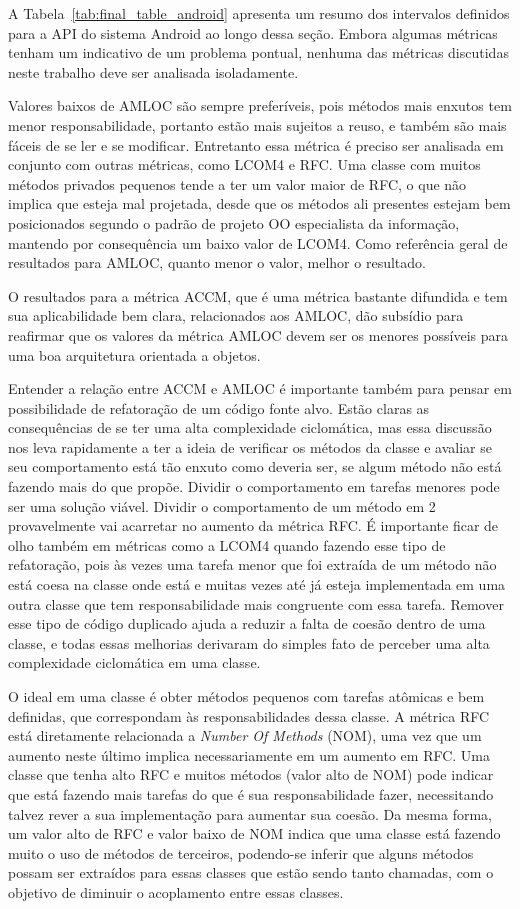 A Tabela~\ref{tab:final_table_android} apresenta um resumo dos intervalos definidos para a API do sistema Android ao longo dessa seção. Embora algumas métricas tenham um indicativo de um problema pontual, nenhuma das métricas discutidas neste trabalho deve ser analisada isoladamente.

Valores baixos de AMLOC são sempre preferíveis, pois métodos mais enxutos tem menor responsabilidade, portanto estão mais sujeitos a reuso, e também são mais fáceis de se ler e se modificar. Entretanto essa métrica é preciso ser analisada em conjunto com outras métricas, como LCOM4 e RFC. Uma classe com muitos métodos privados pequenos tende a ter um valor maior de RFC, o que não implica que esteja mal projetada, desde que os métodos ali presentes estejam bem posicionados segundo o padrão de projeto OO especialista da informação, mantendo por consequência um baixo valor de LCOM4. Como referência geral de resultados para AMLOC, quanto menor o valor, melhor o resultado.

O resultados para a métrica ACCM, que é uma métrica bastante difundida e tem sua aplicabilidade bem clara, relacionados aos AMLOC, dão subsídio para reafirmar que os valores da métrica AMLOC devem ser os menores possíveis para uma boa arquitetura orientada a objetos.

Entender a relação entre ACCM e AMLOC é importante também para pensar em possibilidade de refatoração de um código fonte alvo. Estão claras as consequências de se ter uma alta complexidade ciclomática, mas essa discussão nos leva rapidamente a ter a ideia de verificar os métodos da classe e avaliar se seu comportamento está tão enxuto como deveria ser, se algum método não está fazendo mais do que propõe. Dividir o comportamento em tarefas menores pode ser uma solução viável. Dividir o comportamento de um método em 2 provavelmente vai acarretar no aumento da métrica RFC. É importante ficar de olho também em métricas como a LCOM4 quando fazendo esse tipo de refatoração, pois às vezes uma tarefa menor que foi extraída de um método não está coesa na classe onde está e muitas vezes até já esteja implementada em uma outra classe que tem responsabilidade mais congruente com essa tarefa. Remover esse tipo de código duplicado ajuda a reduzir a falta de coesão dentro de uma classe, e todas essas melhorias derivaram do simples fato de perceber uma alta complexidade ciclomática em uma classe.

O ideal em uma classe é obter métodos pequenos com tarefas atômicas e bem definidas, que correspondam às responsabilidades dessa classe. A métrica RFC está diretamente relacionada a \textit{Number Of Methods} (NOM), uma vez que um aumento neste último implica necessariamente em um aumento em RFC. Uma classe que tenha alto RFC e muitos métodos (valor alto de NOM) pode indicar que está fazendo mais tarefas do que é sua responsabilidade fazer, necessitando talvez rever a sua implementação para aumentar sua coesão. Da mesma forma, um valor alto de RFC e valor baixo de NOM indica que uma classe está fazendo muito o uso de métodos de terceiros, podendo-se inferir que alguns métodos possam ser extraídos para essas classes que estão sendo tanto chamadas, com o objetivo de diminuir o acoplamento entre essas classes.


